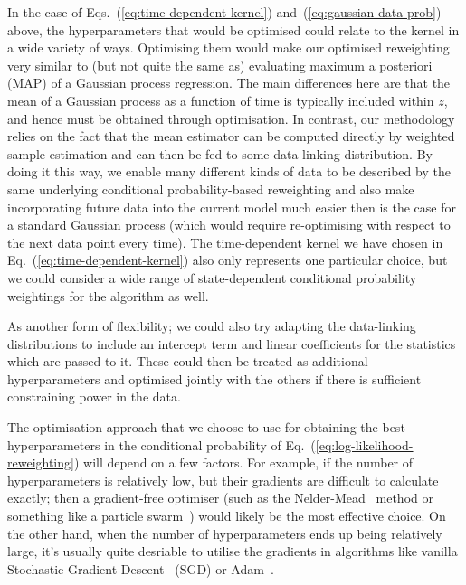 In the case of Eqs.~(\ref{eq:time-dependent-kernel}) and~(\ref{eq:gaussian-data-prob}) above, the hyperparameters that would be optimised could relate to the kernel in a wide variety of ways. Optimising them would make our optimised reweighting very similar to (but not quite the same as) evaluating maximum a posteriori (MAP) of a Gaussian process regression. The main differences here are that the mean of a Gaussian process as a function of time is typically included within $z$, and hence must be obtained through optimisation. In contrast, our methodology relies on the fact that the mean estimator can be computed directly by weighted sample estimation and can then be fed to some data-linking distribution. By doing it this way, we enable many different kinds of data to be described by the same underlying conditional probability-based reweighting and also make incorporating future data into the current model much easier then is the case for a standard Gaussian process (which would require re-optimising with respect to the next data point every time). The time-dependent kernel we have chosen in Eq.~(\ref{eq:time-dependent-kernel}) also only represents one particular choice, but we could consider a wide range of state-dependent conditional probability weightings for the algorithm as well. 

As another form of flexibility; we could also try adapting the data-linking distributions to include an intercept term and linear coefficients for the statistics which are passed to it. These could then be treated as additional hyperparameters and optimised jointly with the others if there is sufficient constraining power in the data.

The optimisation approach that we choose to use for obtaining the best hyperparameters in the conditional probability of Eq.~(\ref{eq:log-likelihood-reweighting}) will depend on a few factors. For example, if the number of hyperparameters is relatively low, but their gradients are difficult to calculate exactly; then a gradient-free optimiser (such as the Nelder-Mead~\cite{nelder1965simplex} method or something like a particle swarm~\cite{kennedy1995particle, shi1998modified}) would likely be the most effective choice. On the other hand, when the number of hyperparameters ends up being relatively large, it's usually quite desriable to utilise the gradients in algorithms like vanilla Stochastic Gradient Descent~\cite{robbins1951stochastic} (SGD) or Adam~\cite{kingma2014adam}.

